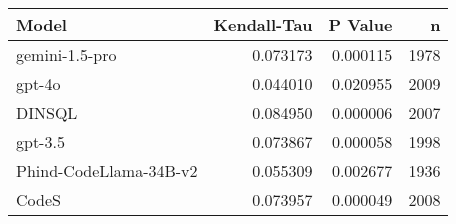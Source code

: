 \begin{tabular}{lrrr}
\toprule
Model & Kendall-Tau & P Value & n \\
\midrule
gemini-1.5-pro & 0.073173 & 0.000115 & 1978 \\
gpt-4o & 0.044010 & 0.020955 & 2009 \\
DINSQL & 0.084950 & 0.000006 & 2007 \\
gpt-3.5 & 0.073867 & 0.000058 & 1998 \\
Phind-CodeLlama-34B-v2 & 0.055309 & 0.002677 & 1936 \\
CodeS & 0.073957 & 0.000049 & 2008 \\
\bottomrule
\end{tabular}
